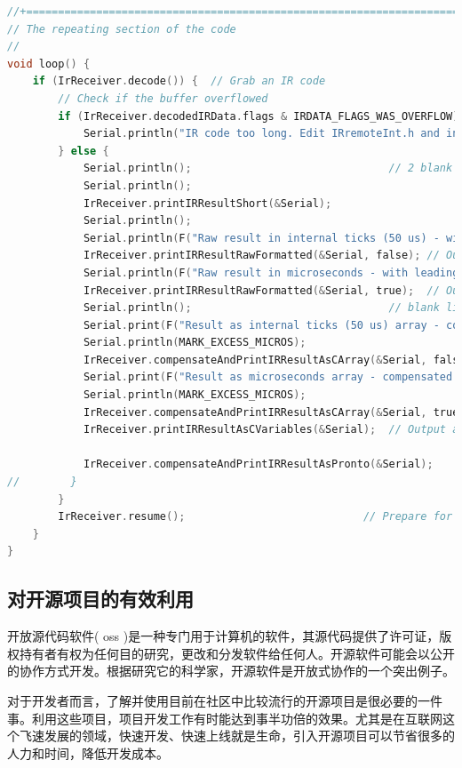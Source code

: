 \begin{lstlisting}[language=C,title=代码4-1: Arduino的红外解码程序]
//+=============================================================================
// The repeating section of the code
//
void loop() {
	if (IrReceiver.decode()) {  // Grab an IR code
		// Check if the buffer overflowed
		if (IrReceiver.decodedIRData.flags & IRDATA_FLAGS_WAS_OVERFLOW) {
			Serial.println("IR code too long. Edit IRremoteInt.h and increase RAW_BUFFER_LENGTH");
		} else {
			Serial.println();                               // 2 blank lines between entries
			Serial.println();
			IrReceiver.printIRResultShort(&Serial);
			Serial.println();
			Serial.println(F("Raw result in internal ticks (50 us) - with leading gap"));
			IrReceiver.printIRResultRawFormatted(&Serial, false); // Output the results in RAW format
			Serial.println(F("Raw result in microseconds - with leading gap"));
			IrReceiver.printIRResultRawFormatted(&Serial, true);  // Output the results in RAW format
			Serial.println();                               // blank line between entries
			Serial.print(F("Result as internal ticks (50 us) array - compensated with MARK_EXCESS_MICROS="));
			Serial.println(MARK_EXCESS_MICROS);
			IrReceiver.compensateAndPrintIRResultAsCArray(&Serial, false); // Output the results as uint8_t source code array of ticks
			Serial.print(F("Result as microseconds array - compensated with MARK_EXCESS_MICROS="));
			Serial.println(MARK_EXCESS_MICROS);
			IrReceiver.compensateAndPrintIRResultAsCArray(&Serial, true); // Output the results as uint16_t source code array of micros
			IrReceiver.printIRResultAsCVariables(&Serial);  // Output address and data as source code variables

			IrReceiver.compensateAndPrintIRResultAsPronto(&Serial);
//        }
		}
		IrReceiver.resume();                            // Prepare for the next value
	}
}
\end{lstlisting}

\subsection{对开源项目的有效利用}

开放源代码软件( oss )是一种专门用于计算机的软件，其源代码提供了许可证，版权持有者有权为任何目的研究，更改和分发软件给任何人。开源软件可能会以公开的协作方式开发。根据研究它的科学家，开源软件是开放式协作的一个突出例子。

对于开发者而言，了解并使用目前在社区中比较流行的开源项目是很必要的一件事。利用这些项目，项目开发工作有时能达到事半功倍的效果。尤其是在互联网这个飞速发展的领域，快速开发、快速上线就是生命，引入开源项目可以节省很多的人力和时间，降低开发成本。

